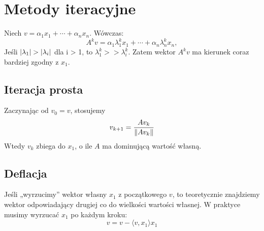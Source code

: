 \section{Metody iteracyjne}
Niech \( v = \alpha_1x_1 + \cdots + \alpha_nx_n \). Wówczas:
\[
	A^kv =\alpha_1\lambda_1^kx_1 + \cdots + \alpha_n\lambda_n^kx_n,
\]
Jeśli \( \left\lvert\lambda_1\right\rvert > \left\lvert\lambda_i\right\rvert \) dla i > 1, to \( \lambda_1^k >\!\!> \lambda_i^k \). Zatem wektor \( A^kv \) ma kierunek coraz bardziej zgodny z \( x_1 \).

\subsection{Iteracja prosta}
Zaczynając od \( v_0 = v \), stosujemy
\[
	v_{k+1} = \frac{Av_k}{\left\Vert Av_k \right\Vert}
\]
Wtedy \( v_ k \) zbiega do \( x_1 \), o ile \( A \) ma dominującą wartość własną.

\subsection{Deflacja}
Jeśli „wyrzucimy” wektor własny \( x_1 \) z początkowego \( v \), to teoretycznie znajdziemy wektor odpowiadający drugiej co do wielkości wartości własnej. W praktyce musimy wyrzucać \( x_1 \) po każdym kroku:
\[
	v = v - \langle v, x_1 \rangle x_1
\]